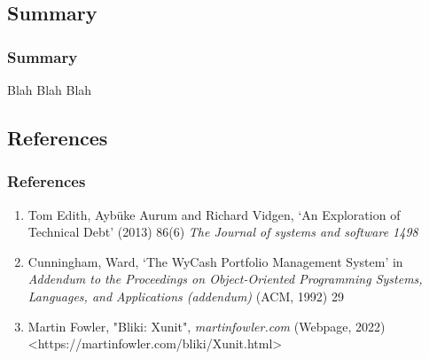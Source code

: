 \documentclass[xcolor]{beamer}
\begin{document}
\subsection{Summary}
\begin{frame}
	\frametitle{Summary}
	Blah Blah Blah
\end{frame}
\subsection{References}
\begin{frame}
	\frametitle{References}
	\begin{enumerate}
		\setlength\itemsep{1em}
		\item Tom Edith, Aybüke Aurum and Richard Vidgen, ‘An Exploration of Technical Debt’ (2013) 86(6) \textit{The Journal of systems and software 1498}
		\item Cunningham, Ward, ‘The WyCash Portfolio Management System’ in \textit{Addendum to the Proceedings on Object-Oriented Programming Systems, Languages, and Applications (addendum)} (ACM, 1992) 29
		\item Martin Fowler, "Bliki: Xunit", \textit{martinfowler.com} (Webpage, 2022) <https://martinfowler.com/bliki/Xunit.html>
	\end{enumerate}
\end{frame}
\end{document}
